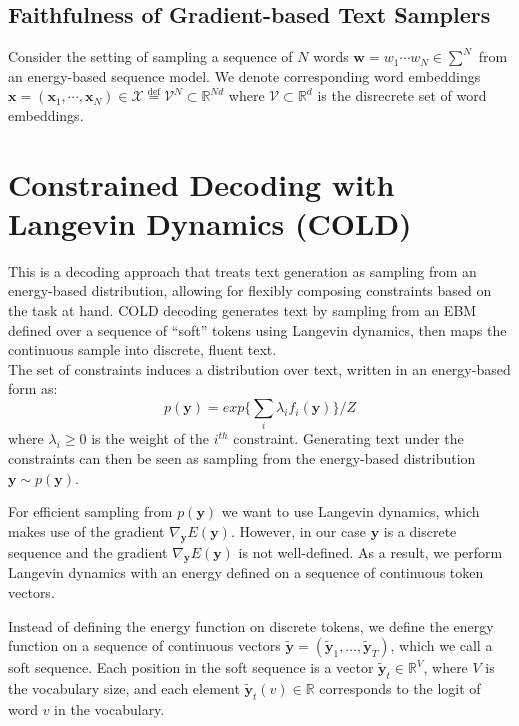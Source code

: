 \documentclass{article}
\newcommand*{\defeq}{\stackrel{\text{def}}{=}}
\begin{document}
\subsection{Faithfulness of Gradient-based Text Samplers}
Consider the setting of sampling a sequence of $N$ words $\boldsymbol{w} = w_1 \cdots w_N \in \sum^{N}$ from an energy-based sequence model. We denote corresponding word embeddings $\boldsymbol{x} = (\boldsymbol{x}_1, \cdots, \boldsymbol{x}_N) \in \mathcal{X} \defeq \mathcal{V}^N \subset \mathbb{R}^{Nd}$ where $\mathcal{V} \subset \mathbb{R}^d$ is the disrecrete set of word embeddings.

\section{Constrained Decoding with Langevin Dynamics (COLD)} \cite[COLD]{cold}
This is a decoding approach that treats text generation as sampling from an energy-based distribution, allowing for flexibly composing constraints
based on the task at hand. COLD decoding generates text by sampling from an EBM defined over a
sequence of “soft” tokens using Langevin dynamics, then maps the continuous sample into discrete,
fluent text. \\
The set of constraints induces a distribution over text, written in an energy-based form as:
$$p(\boldsymbol{y}) = exp\{\sum_i \lambda_i f_i(\boldsymbol{y})\}/Z$$
where $\lambda_i \geq 0$ is the weight of the $i^{th}$ constraint. Generating text under the constraints can then be
seen as sampling from the energy-based distribution $\boldsymbol{y} \sim p(\boldsymbol{y})$.

For efficient sampling from $p(\boldsymbol{y})$ we want to use Langevin dynamics, which
makes use of the gradient $\nabla_{\boldsymbol{y}} E(\boldsymbol{y})$. However, in our case $\boldsymbol{y}$ is a discrete sequence and the gradient
$\nabla_{\boldsymbol{y}} E(\boldsymbol{y})$ is not well-defined. As a result, we perform Langevin dynamics with an energy defined on
a sequence of continuous token vectors.

Instead of defining the energy function on discrete tokens, we define the energy function on a sequence of continuous vectors $\tilde{\boldsymbol{y}} = (\tilde{\boldsymbol{y}}_1, \ldots, \tilde{\boldsymbol{y}}_T)$, which we call a soft sequence. Each position in the soft sequence is a vector $\tilde{\boldsymbol{y}}_t \in \mathbb{R}^V$, where $V$ is the vocabulary size, and each element $\tilde{\boldsymbol{y}}_t(v) \in \mathbb{R}$ corresponds to the logit of word $v$ in the vocabulary.
\end{document}
